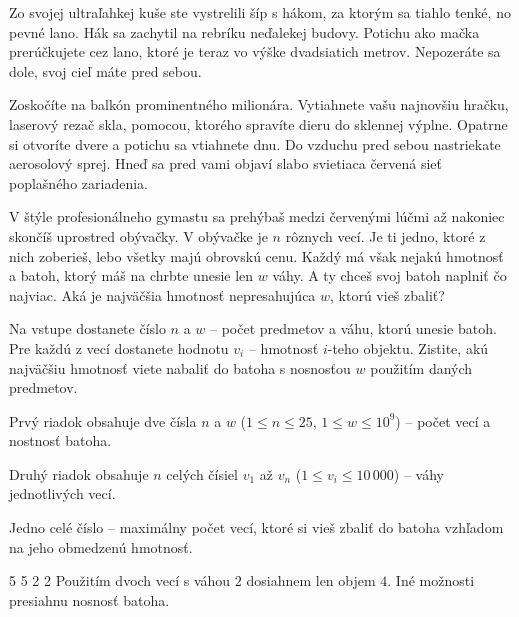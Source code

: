 




Zo svojej ultraľahkej kuše ste vystrelili šíp s hákom, za ktorým sa tiahlo tenké, no pevné lano. Hák
sa zachytil na rebríku neďalekej budovy. Potichu ako mačka prerúčkujete cez lano, ktoré je teraz
vo výške dvadsiatich metrov. Nepozeráte sa dole, svoj cieľ máte pred sebou.

Zoskočíte na balkón prominentného milionára. Vytiahnete vašu najnovšiu hračku, laserový rezač skla,
pomocou, ktorého spravíte dieru do sklennej výplne. Opatrne si otvoríte dvere a potichu sa vtiahnete
dnu. Do vzduchu pred sebou nastriekate aerosolový sprej. Hneď sa pred vami objaví slabo svietiaca
červená sieť poplašného zariadenia.

V štýle profesionálneho gymastu sa prehýbaš medzi červenými lúčmi až nakoniec skončíš uprostred
obývačky. V obývačke je $n$ rôznych vecí. Je ti jedno, ktoré z nich zoberieš, lebo všetky majú
obrovskú cenu. Každý má však nejakú hmotnosť a batoh, ktorý máš na chrbte unesie len $w$ váhy. A ty
chceš svoj batoh naplniť čo najviac. Aká je najväčšia hmotnosť nepresahujúca $w$, ktorú vieš zbaliť?


Na vstupe dostanete číslo $n$ a $w$ -- počet predmetov a váhu, ktorú unesie batoh. Pre každú z vecí
dostanete hodnotu $v_i$ -- hmotnosť $i$-teho objektu. Zistite, akú najväčšiu hmotnosť viete nabaliť
do batoha s nosnosťou $w$ použitím daných predmetov.


Prvý riadok obsahuje dve čísla $n$ a $w$ ($1 \leq n \leq 25$, $1\leq w \leq 10^9$) -- počet vecí a
nostnosť batoha.

Druhý riadok obsahuje $n$ celých čísiel $v_1$ až $v_n$ ($1 \leq v_i \leq 10\,000 $) -- váhy
jednotlivých vecí.


Jedno celé číslo -- maximálny počet vecí, ktoré si vieš zbaliť do batoha vzhľadom na jeho obmedzenú
hmotnosť.


 5
5 2 2
\komentar
Použitím dvoch vecí s váhou $2$ dosiahnem len objem $4$. Iné možnosti presiahnu nosnosť batoha.
\koniec


